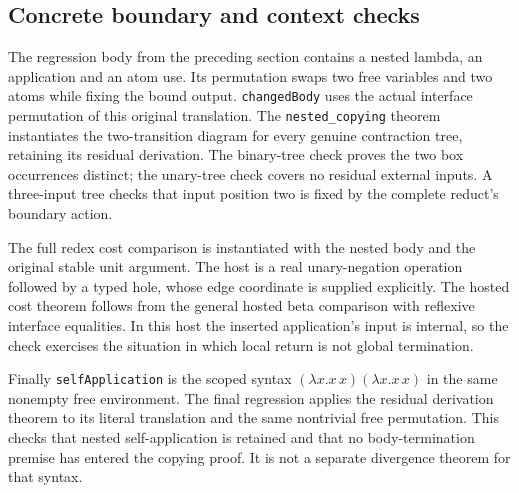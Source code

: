 \subsection{Concrete boundary and context checks}
The regression body from the preceding section contains a nested lambda,
an application and an atom use. Its permutation swaps two free variables and
two atoms while fixing the bound output. \texttt{changedBody} uses the actual
interface permutation of this original translation. The \texttt{nested\_copying}
theorem instantiates the two-transition diagram for every genuine contraction
tree, retaining its residual derivation. The binary-tree check proves the two
box occurrences distinct; the unary-tree check covers no residual external
inputs. A three-input tree checks that input position two is fixed by the
complete reduct's boundary action.


The full redex cost comparison is instantiated with the nested body and the
original stable unit argument. The host is a real unary-negation operation
followed by a typed hole, whose edge coordinate is supplied explicitly.
The hosted cost theorem follows from the general hosted beta comparison with
reflexive interface equalities. In this host the inserted application's input
is internal, so the check exercises the situation in which local return is
not global termination.


Finally \texttt{selfApplication} is the scoped syntax
$(\lambda x.x\,x)(\lambda x.x\,x)$ in the same nonempty free environment.
The final regression applies the residual derivation theorem to its literal
translation and the same nontrivial free permutation. This checks that nested
self-application is retained and that no body-termination premise has entered
the copying proof. It is not a separate divergence theorem for that syntax.

